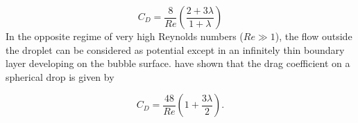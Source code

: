 

\begin{equation}
C_D = \frac{8}{Re} \left( \frac{2+3\lambda}{1+\lambda} \right)

\end{equation}
In the opposite regime of very high Reynolds numbers ($Re\gg 1$), the flow outside the droplet can be considered as potential except in an infinitely thin boundary layer developing on the bubble surface. \citet{harper1968} have shown that the drag coefficient on a spherical drop is given by 

\begin{equation}
C_D = \frac{48}{Re}\left(1 + \frac{3\lambda}{2}\right).
\label{eq:harper}
\end{equation}

